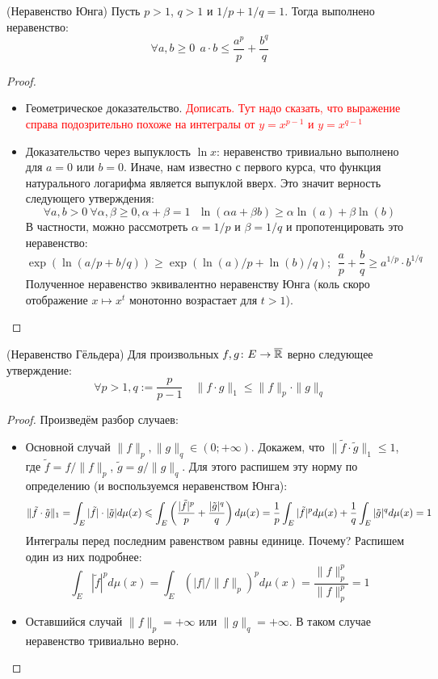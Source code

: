 \begin{proposition} (Неравенство Юнга)
	Пусть $p > 1$, $q > 1$ и $1 / p + 1 / q = 1$. Тогда выполнено неравенство:
	\[
		\forall a, b \ge 0\ \ a \cdot b \le \frac{a^p}{p} + \frac{b^q}{q}
	\]
\end{proposition}

\begin{proof}~
	\begin{itemize}
		\item Геометрическое доказательство. \textcolor{red}{Дописать. Тут надо сказать, что выражение справа подозрительно похоже на интегралы от $y = x^{p - 1}$ и $y = x^{q - 1}$}
		
		\item Доказательство через выпуклость $\ln x$: неравенство тривиально выполнено для $a = 0$ или $b = 0$. Иначе, нам известно с первого курса, что функция натурального логарифма является выпуклой вверх. Это значит верность следующего утверждения:
		\[
			\forall a, b > 0\ \forall \alpha, \beta \ge 0, \alpha + \beta = 1\ \ \ \ln(\alpha a + \beta b) \ge \alpha\ln(a) + \beta\ln(b)
		\]
		В частности, можно рассмотреть $\alpha = 1 / p$ и $\beta = 1 / q$ и пропотенцировать это неравенство:
		\[
			\exp(\ln(a / p + b / q)) \ge \exp(\ln(a) / p + \ln(b) / q);\ \ \frac{a}{p} + \frac{b}{q} \ge a^{1/p} \cdot b^{1/q}
		\]
		Полученное неравенство эквивалентно неравенству Юнга (коль скоро отображение $x \mapsto x^t$ монотонно возрастает для $t > 1$).
	\end{itemize}
\end{proof}

\begin{theorem} (Неравенство Гёльдера)
	Для произвольных $f, g \colon E \to \overline{\mathbb{R}}$ верно следующее утверждение:
	\[
		\forall p > 1, q := \frac{p}{p - 1} \quad \|f \cdot g\|_1 \le \|f\|_p \cdot \|g\|_q
	\]
\end{theorem}

\begin{proof}
	Произведём разбор случаев:
	\begin{itemize}
		\item Основной случай $\|f\|_p, \|g\|_q \in (0; +\infty)$. Докажем, что $\|\tilde{f} \cdot \tilde{g}\|_1 \le 1$, где $\tilde{f} = f / \|f\|_p$, $\tilde{g} = g / \|g\|_q$. Для этого распишем эту норму по определению (и воспользуемся неравенством Юнга):
		\[
			\|\tilde{f} \cdot \tilde{g}\|_1 = \int_E |\tilde{f}| \cdot |\tilde{g}|d\mu(x) \leqslant \int_E \left(\frac{|\tilde{f}|^p}{p} + \frac{|\tilde{g}|^q}{q}\right)d\mu(x) = \frac{1}{p} \int_E |\tilde{f}|^pd\mu(x) + \frac{1}{q} \int_E |\tilde{g}|^qd\mu(x) = 1
		\]
		Интегралы перед последним равенством равны единице. Почему? Распишем один из них подробнее:
		\[
			\int_E |\tilde{f}|^pd\mu(x) = \int_E (|f| / \|f\|_p)^pd\mu(x) = \frac{\|f\|_p^p}{\|f\|_p^p} = 1
		\]
		
		\item Оставшийся случай $\|f\|_p = +\infty$ или $\|g\|_q = +\infty$. В таком случае неравенство тривиально верно.
	\end{itemize}
\end{proof}

